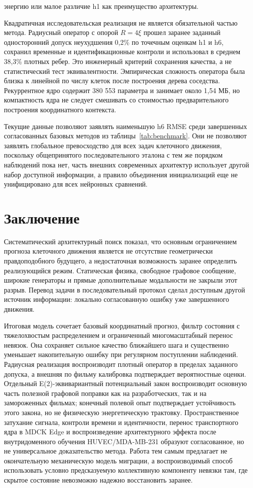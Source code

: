 \documentclass[11pt,a4paper]{article}
\begin{document}
энергию или малое различие h1 как преимущество архитектуры.

Квадратичная исследовательская реализация не является обязательной частью метода. Радиусный оператор с опорой $R=4\xi$ прошел заранее заданный односторонний допуск неухудшения 0,2\% по точечным оценкам h1 и h6, сохранил временные и идентификационные контроли и использовал в среднем 38,3\% плотных ребер. Это инженерный критерий сохранения качества, а не статистический тест эквивалентности. Эмпирическая сложность оператора была близка к линейной по числу клеток после построения дерева соседства. Рекуррентное ядро содержит 380 553 параметра и занимает около 1,54 МБ, но компактность ядра не следует смешивать со стоимостью предварительного построения координатного контекста.

Текущие данные позволяют заявлять наименьшую h6 RMSE среди завершенных согласованных базовых методов из таблицы~\ref{tab:benchmark}. Они не позволяют заявлять глобальное превосходство для всех задач клеточного движения, поскольку общепринятого последовательного эталона с тем же порядком наблюдений пока нет, часть внешних современных архитектур использует другой набор доступной информации, а правило объединения инициализаций еще не унифицировано для всех нейронных сравнений.

\section{Заключение}
Систематический архитектурный поиск показал, что основным ограничением прогноза клеточного движения является не отсутствие геометрически правдоподобного будущего, а недостаточная возможность заранее определить реализующийся режим. Статическая физика, свободное графовое сообщение, широкие генераторы и прямые дополнительные модальности не закрыли этот разрыв. Перевод задачи в последовательный протокол сделал доступным другой источник информации: локально согласованную ошибку уже завершенного движения.

Итоговая модель сочетает базовый координатный прогноз, фильтр состояния с тяжелохвостым распределением и ограниченный многомасштабный перенос невязок. Она сохраняет сильное качество ближайшего шага и существенно уменьшает накопительную ошибку при регулярном поступлении наблюдений. Радиусная реализация воспроизводит плотный оператор в пределах заданного допуска, а внешняя по фильму калибровка подтверждает вероятностные оценки. Отдельный E(2)-эквивариантный потенциальный закон воспроизводит основную часть полезной графовой поправки как на разработческих, так и на замороженных фильмах; конечный полевой опыт подтверждает устойчивость этого закона, но не физическую энергетическую трактовку. Пространственное затухание сигнала, контроли времени и идентичности, перенос транспортного ядра в MDCK Edge и воспроизведение архитектурного эффекта после внутридоменного обучения HUVEC/MDA-MB-231 образуют согласованное, но не универсальное доказательство метода. Работа тем самым предлагает не окончательную механическую модель миграции, а воспроизводимый способ использовать условно предсказуемую коллективную компоненту невязки там, где скрытое состояние невозможно надежно восстановить заранее.
\end{document}
